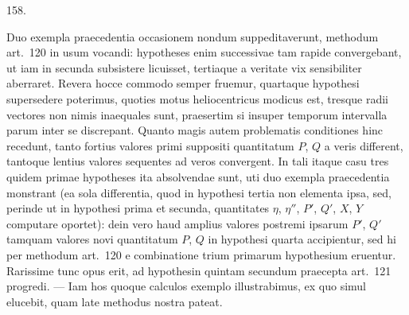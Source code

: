 \par{}\medskip
\hypertarget{native-217-article158}{}
\begin{center}158.\end{center}
Duo exempla praecedentia occasionem nondum suppeditaverunt, methodum art.~120 in usum vocandi: hypotheses enim successivae tam rapide convergebant, ut iam in secunda subsistere licuisset, tertiaque a veritate vix sensibiliter aberraret. Revera hocce commodo semper fruemur, quartaque hypothesi supersedere poterimus, quoties motus heliocentricus modicus est, tresque radii vectores non nimis inaequales sunt, praesertim si insuper temporum intervalla parum inter se discrepant. Quanto magis autem problematis conditiones hinc recedunt, tanto fortius valores primi suppositi quantitatum $P$, $Q$ a veris different, tantoque lentius valores sequentes ad veros convergent. In tali itaque casu tres quidem primae hypotheses ita absolvendae sunt, uti duo exempla praecedentia monstrant (ea sola differentia, quod in hypothesi tertia non elementa ipsa, sed, perinde ut in hypothesi prima et secunda,
quantitates $\eta$, $\eta''$, $P'$, $Q'$, $X$, $Y$ computare oportet): dein vero haud amplius valores postremi ipsarum $P'$, $Q'$ tamquam valores novi quantitatum $P$, $Q$ in hypothesi quarta accipientur, sed hi per methodum art.~120 e combinatione trium primarum hypothesium eruentur. Rarissime tunc opus erit, ad hypothesin quintam secundum praecepta art.~121 progredi. --- Iam hos quoque calculos exemplo illustrabimus, ex quo simul elucebit, quam late methodus nostra pateat.
